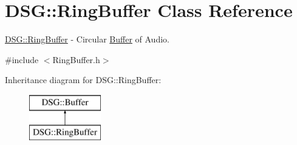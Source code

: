 \hypertarget{class_d_s_g_1_1_ring_buffer}{\section{D\+S\+G\+:\+:Ring\+Buffer Class Reference}
\label{class_d_s_g_1_1_ring_buffer}
}


\hyperlink{class_d_s_g_1_1_ring_buffer}{D\+S\+G\+::\+Ring\+Buffer} -\/ Circular \hyperlink{class_d_s_g_1_1_buffer}{Buffer} of Audio.  




{\ttfamily \#include $<$Ring\+Buffer.\+h$>$}

Inheritance diagram for D\+S\+G\+:\+:Ring\+Buffer\+:\begin{figure}[H]
\begin{center}
\leavevmode
\includegraphics[height=2.000000cm]{class_d_s_g_1_1_ring_buffer}
\end{center}
\end{figure}
